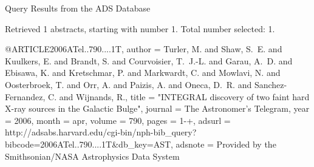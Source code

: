Query Results from the ADS Database


Retrieved 1 abstracts, starting with number 1.  Total number selected: 1.

@ARTICLE{2006ATel..790....1T,
   author = {{Turler}, M. and {Shaw}, S.~E. and {Kuulkers}, E. and {Brandt}, S. and 
	{Courvoisier}, T.~J.-L. and {Garau}, A.~D. and {Ebisawa}, K. and 
	{Kretschmar}, P. and {Markwardt}, C. and {Mowlavi}, N. and {Oosterbroek}, T. and 
	{Orr}, A. and {Paizis}, A. and {Oneca}, D.~R. and {Sanchez-Fernandez}, C. and 
	{Wijnands}, R.},
    title = "{INTEGRAL discovery of two faint hard X-ray sources in the Galactic Bulge}",
  journal = {The Astronomer's Telegram},
     year = 2006,
    month = apr,
   volume = 790,
    pages = {1-+},
   adsurl = {http://adsabs.harvard.edu/cgi-bin/nph-bib_query?bibcode=2006ATel..790....1T&db_key=AST},
  adsnote = {Provided by the Smithsonian/NASA Astrophysics Data System}
}


